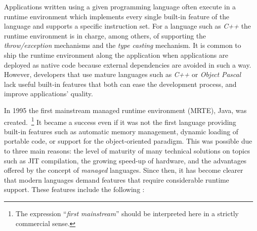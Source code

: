 Applications written using a given programming language often execute in a runtime environment which implements every single built-in feature of the language and supports a specific instruction set.
For a language such as \textit{C++} the runtime environment is in charge, among others, of supporting the \textit{throw/exception} mechanisms and the \textit{type casting} mechanism.
It is common to ship the runtime environment along the application when applications are deployed as native code because external dependencies are avoided in such a way.
However, developers that use mature languages such as \textit{C++} or \textit{Object Pascal} lack useful built-in features that both can ease the development process, and improve applications' quality.

In 1995 the first mainstream managed runtime environment (MRTE), Java, was created.~\footnote{The expression ``\textit{first mainstream}'' should be interpreted here in a strictly commercial sense.}
It became a success even if it was not the first language providing built-in features such as automatic memory management, dynamic loading of portable code, or support for the object-oriented paradigm.
This was possible due to three main reasons: the level of maturity of many technical solutions on topics such as \gls{JIT} compilation, the growing speed-up of hardware, and the advantages offered by the concept of \textit{managed} languages.
Since then, it has become clearer that modern languages demand features that require considerable runtime support.
These features include the following \cite{Cierniak2005}:

%

